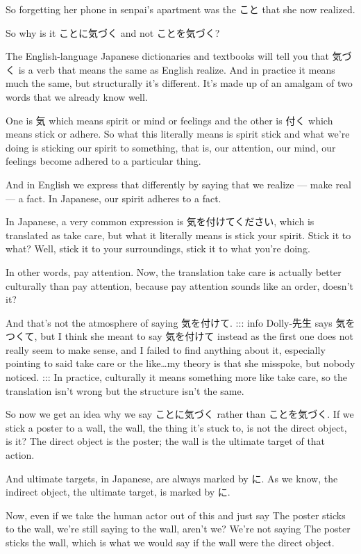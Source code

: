 So forgetting her phone in senpai's apartment was the こと that she now realized.

So why is it ことに気づく and not ことを気づく?

{}

The English-language Japanese dictionaries and textbooks will tell you that 気づく is a verb that means the same as English realize. And in practice it means much the same, but structurally it's different. It's made up of an amalgam of two words that we already know well.

One is 気 which means spirit or mind or feelings and the other is 付く which means stick or adhere. So what this literally means is spirit stick and what we're doing is sticking our spirit to something, that is, our attention, our mind, our feelings become adhered to a particular thing.

And in English we express that differently by saying that we realize --- make real --- a fact. In Japanese, our spirit adheres to a fact.

In Japanese, a very common expression is 気を付けてください, which is translated as take care, but what it literally means is stick your spirit. Stick it to what? Well, stick it to your surroundings, stick it to what you're doing.

In other words, pay attention. Now, the translation take care is actually better culturally than pay attention, because pay attention sounds like an order, doesn't it?

And that's not the atmosphere of saying 気を付けて. ::: info Dolly-先生 says 気をつくて, but I think she meant to say 気を付けて instead as the first one does not really seem to make sense, and I failed to find anything about it, especially pointing to said take care or the like\ldots{}my theory is that she misspoke, but nobody noticed. ::: In practice, culturally it means something more like take care, so the translation isn't wrong but the structure isn't the same.

So now we get an idea why we say ことに気づく rather than ことを気づく. If we stick a poster to a wall, the wall, the thing it's stuck to, is not the direct object, is it? The direct object is the poster; the wall is the ultimate target of that action.

And ultimate targets, in Japanese, are always marked by に. As we know, the indirect object, the ultimate target, is marked by に.

Now, even if we take the human actor out of this and just say The poster sticks to the wall, we're still saying to the wall, aren't we? We're not saying The poster sticks the wall, which is what we would say if the wall were the direct object.

